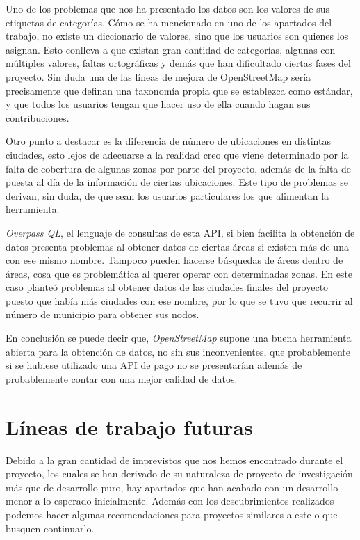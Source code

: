 Uno de los problemas que nos ha presentado los datos son los valores de sus etiquetas de categorías. Cómo se ha mencionado en uno de los apartados del trabajo, no existe un diccionario de valores, sino que los usuarios son quienes los asignan. Esto conlleva a que existan gran cantidad de categorías, algunas con múltiples valores, faltas ortográficas y demás que han dificultado ciertas fases del proyecto. Sin duda una de las líneas de mejora de OpenStreetMap sería precisamente que definan una taxonomía propia que se establezca como estándar, y que todos los usuarios tengan que hacer uso de ella cuando hagan sus contribuciones. 

Otro punto a destacar es la diferencia de número de ubicaciones en distintas ciudades, esto lejos de adecuarse a la realidad creo que viene determinado por la falta de cobertura de algunas zonas por parte del proyecto, además de la falta de puesta al día de la información de ciertas ubicaciones. Este tipo de problemas se derivan, sin duda, de que sean los usuarios particulares los que alimentan la herramienta.

\textit{Overpass QL}, el lenguaje de consultas de esta API, si bien facilita la obtención de datos presenta problemas al obtener datos de ciertas áreas si existen más de una con ese mismo nombre. Tampoco pueden hacerse búsquedas de áreas dentro de áreas, cosa que es problemática al querer operar con determinadas zonas. En este caso planteó problemas al obtener datos de las ciudades finales del proyecto puesto que había más ciudades con ese nombre, por lo que se tuvo que recurrir al número de municipio para obtener sus nodos.

En conclusión se puede decir que, \textit{OpenStreetMap} supone una buena herramienta abierta para la obtención de datos, no sin sus inconvenientes, que probablemente si se hubiese utilizado una API de pago no se presentarían además de probablemente contar con una mejor calidad de datos.



\section{Líneas de trabajo futuras}

Debido a la gran cantidad de imprevistos que nos hemos encontrado durante el proyecto, los cuales se han derivado de su naturaleza de proyecto de investigación más que de desarrollo puro, hay apartados que han acabado con un desarrollo menor a lo esperado inicialmente. Además con los descubrimientos realizados podemos hacer algunas recomendaciones para proyectos similares a este o que busquen continuarlo.

